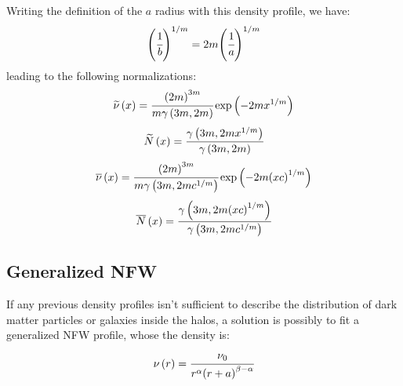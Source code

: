 Writing the definition of the $a$ radius with this density profile, we have:
%
\begin{equation}
    {\left(\cfrac{1}{b}\right)}^{1/m} = 2m{\left(\cfrac{1}{a}\right)}^{1/m}
\end{equation}
%
leading to the following normalizations:
%
\begin{equation}
    \widetilde\nu \left(x\right) = \cfrac{{\left(2m\right)}^{3m}}{m\gamma
    \left(3m, 2m\right)} \exp \left(-2mx^{1/m}\right)
\end{equation}
%
\begin{equation}
    \widetilde{N} \left(x\right) = \cfrac{\gamma \left(3m, 2m
    x^{1/m}\right)}{\gamma \left(3m, 2m\right)}
\end{equation}
%
\begin{equation}
    \overline\nu \left(x\right) = \cfrac{{\left(2m\right)}^{3m}}{m\gamma
    \left(3m, 2m c^{1/m}\right)} \exp \left(-2m{\left(xc\right)}^{1/m}\right)
\end{equation}
%
\begin{equation}
    \overline{N} \left(x\right) = \cfrac{\gamma \left(3m, 2m
        {\left(xc\right)}^{1/m}\right)}{\gamma \left(3m, 2m c^{1/m}\right)}
\end{equation}

\subsection{Generalized NFW}
\label{sub:generalized_nfw}

If any previous density profiles isn't sufficient to describe the distribution
of dark matter particles or galaxies inside the halos, a solution is possibly
to fit a generalized NFW profile, whose the density is:
%
\begin{equation}
    \nu \left(r\right) =
    \cfrac{\nu_0}{r^\alpha{\left(r+a\right)}^{\beta-\alpha}}
\end{equation}

